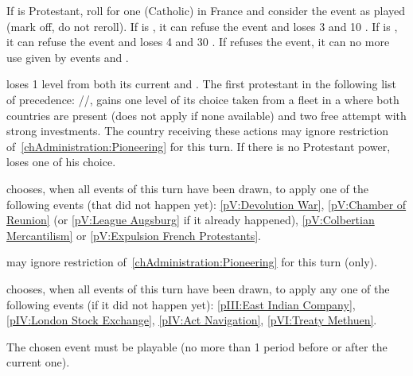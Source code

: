 

\condition{}
\aparag If \FRA is Protestant, roll for one (Catholic) \REVOLT in France and
consider the event as played (mark off, do not reroll).
\aparag If \FRA is \CATHCO, it can refuse the event and loses 3 \STAB and 10
\PV.
\aparag If \FRA is \CATHCR, it can refuse the event and loses 4 \STAB and 30
\PV.
\aparag If \FRA refuses the event, it can no more use \CB given by events
 and .

\phevnt
\aparag \FRA loses 1 level from both its current \FTI and \DTI.
\aparag The first protestant in the following list of precedence:
\HOL/\ENG/\SUE, gains one \TradeFLEET level of its choice taken from a
\TradeFLEET fleet in a \STZ where both countries are present (does not apply
if none available) and two free \COL attempt with strong investments.
\bparag The country receiving these actions may ignore restriction
of~\ref{chAdministration:Pioneering} for this turn.
\bparag If there is no Protestant power, \FRA loses one \TradeFLEET of his
choice.





\phevnt
\aparag \FRA chooses, when all events of this turn have been drawn, to apply
one of the following events (that did not happen yet): \ref{pV:Devolution
  War}, \ref{pV:Chamber of Reunion} (or \ref{pV:League Augsburg} if it already
happened), \ref{pV:Colbertian Mercantilism} or \ref{pV:Expulsion French
  Protestants}.

\phadm
\aparag \FRA may ignore restriction of~\ref{chAdministration:Pioneering} for
this turn (only).




\history{}

\phevnt
\aparag \ENG chooses, when all events of this turn have been drawn, to apply
any one of the following events (if it did not happen yet): \ref{pIII:East
  Indian Company}, \ref{pIV:London Stock Exchange}, \ref{pIV:Act Navigation},
\ref{pVI:Treaty Methuen}.

\bparag The chosen event must be playable (no more than 1 period before or
after the current one).


